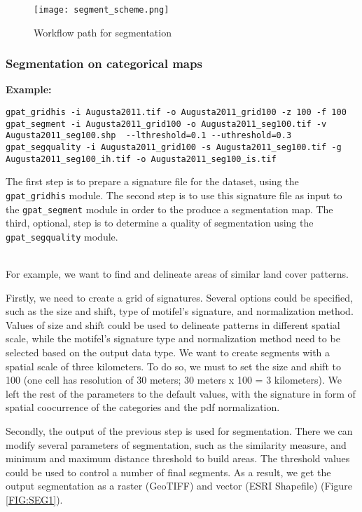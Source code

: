 \begin{figure}[H]
	\centering
	\texttt{[image: segment\_scheme.png]}
	\caption{Workflow path for segmentation}
	\label{FIG:SEGMENT}
\end{figure}

\subsubsection{Segmentation on categorical maps}

{\bf Example:}

\begin{minipage}{\linewidth}
\begin{lstlisting}
gpat_gridhis -i Augusta2011.tif -o Augusta2011_grid100 -z 100 -f 100
gpat_segment -i Augusta2011_grid100 -o Augusta2011_seg100.tif -v Augusta2011_seg100.shp  --lthreshold=0.1 --uthreshold=0.3
gpat_segquality -i Augusta2011_grid100 -s Augusta2011_seg100.tif -g Augusta2011_seg100_ih.tif -o Augusta2011_seg100_is.tif
\end{lstlisting}
\end{minipage}

The first step is to prepare a signature file for the dataset, using the {\tt gpat\_gridhis} module.
The second step is to use this signature file as input to the {\tt gpat\_segment} module in order to the produce a segmentation map. 
The third, optional, step is to determine a quality of segmentation using the {\tt gpat\_segquality} module.\\\\

\newpage

For example, we want to find and delineate areas of similar land cover patterns. 

Firstly, we need to create a grid of signatures. 
Several options could be specified, such as the size and shift, type of motifel's signature, and normalization method.
Values of size and shift could be used to delineate patterns in different spatial scale, while the motifel's signature type and normalization method need to be selected based on the output data type.
We want to create segments with a spatial scale of three kilometers. 
To do so, we must to set the size and shift to 100 (one cell has resolution of 30 meters; 30 meters x 100 = 3 kilometers).
We left the rest of the parameters to the default values, with the signature in form of spatial coocurrence of the categories and the pdf normalization.

Secondly, the output of the previous step is used for segmentation. 
There we can modify several parameters of segmentation, such as the similarity measure, and minimum and maximum distance threshold to build areas.
The threshold values could be used to control a number of final segments.
As a result, we get the output segmentation as a raster (GeoTIFF) and vector (ESRI Shapefile) (Figure \ref{FIG:SEG1}).

